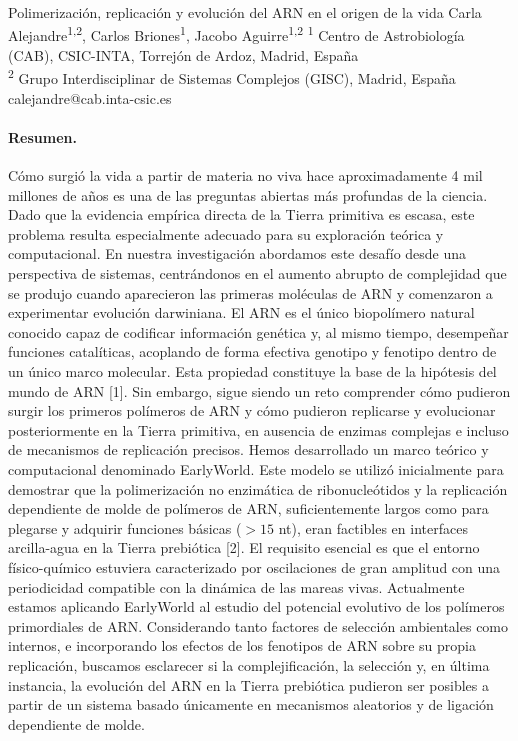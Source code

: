 \documentclass[11pt,a4paper]{article}
\begin{document}
\begin{sincabstract}
{Polimerización, replicación y evolución del ARN en el origen de la vida}
{Carla Alejandre\textsuperscript{1,2}, Carlos Briones\textsuperscript{1}, Jacobo Aguirre\textsuperscript{1,2}}
{\textsuperscript{1} Centro de Astrobiología (CAB), CSIC-INTA, Torrejón de Ardoz, Madrid, España\\
\textsuperscript{2} Grupo Interdisciplinar de Sistemas Complejos (GISC), Madrid, España}
{calejandre@cab.inta-csic.es}

\vspace{-0.5cm}

\paragraph{Resumen.}
Cómo surgió la vida a partir de materia no viva hace aproximadamente 4 mil millones de años es una de las preguntas abiertas más profundas de la ciencia. Dado que la evidencia empírica directa de la Tierra primitiva es escasa, este problema resulta especialmente adecuado para su exploración teórica y computacional. En nuestra investigación abordamos este desafío desde una perspectiva de sistemas, centrándonos en el aumento abrupto de complejidad que se produjo cuando aparecieron las primeras moléculas de ARN y comenzaron a experimentar evolución darwiniana. El ARN es el único biopolímero natural conocido capaz de codificar información genética y, al mismo tiempo, desempeñar funciones catalíticas, acoplando de forma efectiva genotipo y fenotipo dentro de un único marco molecular. Esta propiedad constituye la base de la hipótesis del mundo de ARN [1]. Sin embargo, sigue siendo un reto comprender cómo pudieron surgir los primeros polímeros de ARN y cómo pudieron replicarse y evolucionar posteriormente en la Tierra primitiva, en ausencia de enzimas complejas e incluso de mecanismos de replicación precisos. Hemos desarrollado un marco teórico y computacional denominado EarlyWorld. Este modelo se utilizó inicialmente para demostrar que la polimerización no enzimática de ribonucleótidos y la replicación dependiente de molde de polímeros de ARN, suficientemente largos como para plegarse y adquirir funciones básicas ($>15$ nt), eran factibles en interfaces arcilla-agua en la Tierra prebiótica [2]. El requisito esencial es que el entorno físico-químico estuviera caracterizado por oscilaciones de gran amplitud con una periodicidad compatible con la dinámica de las mareas vivas. Actualmente estamos aplicando EarlyWorld al estudio del potencial evolutivo de los polímeros primordiales de ARN. Considerando tanto factores de selección ambientales como internos, e incorporando los efectos de los fenotipos de ARN sobre su propia replicación, buscamos esclarecer si la complejificación, la selección y, en última instancia, la evolución del ARN en la Tierra prebiótica pudieron ser posibles a partir de un sistema basado únicamente en mecanismos aleatorios y de ligación dependiente de molde.


\end{sincabstract}
\end{document}
